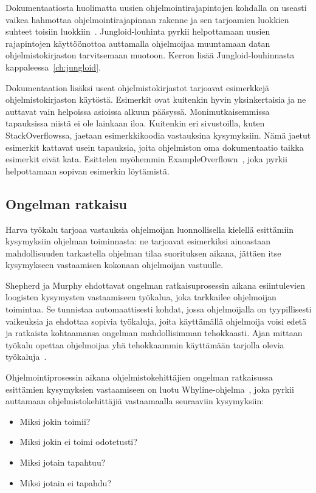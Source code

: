 \documentclass[finnish]{tktltiki2}
\theoremstyle{definition}
\theoremstyle{remark}
\begin{document}
Dokumentaatiosta huolimatta uusien ohjelmointirajapintojen kohdalla on useasti vaikea hahmottaa ohjelmointirajapinnan rakenne ja sen tarjoamien luokkien suhteet toisiin luokkiin~\cite{jungloid-mining}. Jungloid-louhinta pyrkii helpottamaan uusien rajapintojen käyttöönottoa auttamalla ohjelmoijaa muuntamaan datan ohjelmistokirjaston tarvitsemaan muotoon. Kerron lisää Jungloid-louhinnasta kappaleessa~\ref{ch:jungloid}.

Dokumentaation lisäksi useat ohjelmistokirjastot tarjoavat esimerkkejä ohjelmistokirjaston käytöstä. Esimerkit ovat kuitenkin hyvin yksinkertaisia ja ne auttavat vain helpoissa asioissa alkuun pääsyssä. Monimutkaisemmissa tapauksissa niistä ei ole lainkaan iloa. Kuitenkin eri sivustoilla, kuten StackOverflowssa, jaetaan esimerkkikoodia vastauksina kysymyksiin. Nämä jaetut esimerkit kattavat usein tapauksia, joita ohjelmiston oma dokumentaatio taikka esimerkit eivät kata. Esittelen myöhemmin ExampleOverflown~\cite{example-overflow-social-media-for-code-recommendations}, joka pyrkii helpottamaan sopivan esimerkin löytämistä.

\subsection{Ongelman ratkaisu}
Harva työkalu tarjoaa vastauksia ohjelmoijan luonnollisella kielellä esittämiin kysymyksiin ohjelman toiminnasta: ne tarjoavat esimerkiksi ainoastaan mahdollisuuden tarkastella ohjelman tilaa suorituksen aikana, jättäen itse kysymykseen vastaamisen kokonaan ohjelmoijan vastuulle.

Shepherd ja Murphy ehdottavat ongelman ratkaisuprosessin aikana esiintulevien loogisten kysymysten vastaamiseen työkalua, joka tarkkailee ohjelmoijan toimintaa. Se tunnistaa automaattisesti kohdat, jossa ohjelmoijalla on tyypillisesti vaikeuksia ja ehdottaa sopivia työkaluja, joita käyttämällä ohjelmoija voisi edetä ja ratkaista kohtaamansa ongelman mahdollisimman tehokkaasti. Ajan mittaan työkalu opettaa ohjelmoijaa yhä tehokkaammin käyttämään tarjolla olevia työkaluja~\cite{programmers-coach}.

Ohjelmointiprosessin aikana ohjelmistokehittäjien ongelman ratkaisussa esittämien
kysymyksien vastaamiseen on luotu Whyline-ohjelma~\cite{whyline}, joka
pyrkii auttamaan ohjelmistokehittäjiä vastaamaalla seuraaviin kysymyksiin:

\begin{itemize}
  \item Miksi jokin toimii?
  \item Miksi jokin ei toimi odotetusti?
  \item Miksi jotain tapahtuu?
  \item Miksi jotain ei tapahdu?
\end{itemize}
\end{document}
